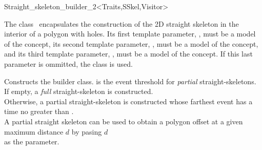 

\begin{ccRefClass}{Straight_skeleton_builder_2<Traits,SSkel,Visitor>}

\ccDefinition
The class \ccRefName\  encapsulates the construction of the 2D straight skeleton in the interior of a polygon with holes.
Its first template parameter, , must be a model of the  concept,
its second template parameter, , must be a model of the  concept, and its third
template parameter, , must be a model of the  concept. If this
last parameter is ommitted, the class  is used.

 
\ccTypes
\ccGlue
\ccGlue
\ccGlue
\ccGlue
\ccGlue

\ccCreation
{}

{Constructs the builder class.  is the event threshold for {\em partial} straight-skeletons. If empty, a {\em full} straight-skeleton is constructed.\\
Otherwise, a partial straight-skeleton is constructed whose farthest event has a time no greater than . \\
A partial straight skeleton can be used to obtain a polygon offset at a given maximum distance $d$ by pasing $d$\\ 
as the  parameter.}


\end{ccRefClass}
